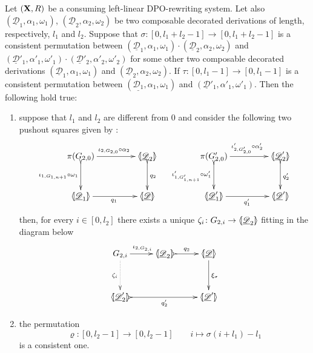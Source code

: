 \documentclass[a4paper,UKenglish,cleveref,pdftex, thm-restate,numberwithinsect]{lipics}
\def\R{\mathsf{R}}
\def\X{\textbf {\textup{X}}}
\newcommand{\dder}[1]{\mathscr{#1}}
\newcommand{\der}[1]{\underline{\dder{#1}}}
\newcommand{\lpro}{\langle \hspace{-1.85pt}[}
\newcommand{\rpro}{]\hspace{-1.85pt}\rangle}
\newcommand{\tpro}[1]{\lpro \der{#1}\rpro}
\begin{document}
\begin{lemma}\label{lem:presuffix} Let $(\X, \R)$ be a consuming left-linear DPO-rewriting system.  Let also $(\der{D}_1, \alpha_1, \omega_1)$, $(\der{D}_2, \alpha_2, \omega_2)$ be two composable decorated derivations of length, respectively, $l_1$ and $l_2$. Suppose that $\sigma\colon [0, l_1+l_2-1]\to [0, l_1+l_2-1]$ is a consistent permutation between $(\der{D}_1, \alpha_1, \omega_1)\cdot (\der{D}_2, \alpha_2, \omega_2)$ and $(\der{D}'_1, \alpha'_1, \omega'_1)\cdot (\der{D}'_2, \alpha'_2, \omega'_2)$ for some other two composable decorated derivations $(\der{D}_1, \alpha_1, \omega_1)$ and $(\der{D}_2, \alpha_2, \omega_2)$.  If $\tau\colon [0,l_1-1]\to [0, l_1-1]$ is a consistent permutation between $(\der{D_1}, \alpha_1, \omega_1)$ and $(\der{D}'_1, \alpha'_1, \omega'_1)$. Then the following hold true:
	\begin{enumerate}
		\item suppose that $l_1$ and $l_2$ are different from $0$ and consider the following two pushout squares given by :
		\[\xymatrix@C=45pt@R=30pt{\pi(G_{2,0}) \ar@{>->}[d]_{\iota_{1, G_{1,n+1}} \circ \omega_1}\ar[r]^{\iota_{2, G_{2,0}} \circ \alpha_2}& \lpro \der{D}_2 \rpro \ar@{>->}[d]^{q_2} &  \pi(G'_{2,0}) \ar@{>->}[d]_{\iota'_{1, G'_{1,n+1}} \circ \omega'_1} \ar[r]^{\iota'_{2, G'_{2,0}} \circ \alpha'_2}& \lpro \der{D}'_2 \rpro \ar@{>->}[d]^{q'_2} \\ \lpro \der{D}_1 \rpro  \ar[r]_{q_1} & \tpro{D} & \lpro \der{D}'_1\rpro \ar[r]_{q'_1} & \lpro \der{D}'\rpro  }\]
		then, for every $i\in [0, l_2]$ there exists a unique $\zeta_i\colon G_{2,i}\to \lpro \der{D}_2\rpro $ fitting in the diagram below
		\[\xymatrix@R=35pt{G_{2,i} \ar[r]^{\iota_{2,G_{2,i}}} \ar@{.>}[d]_{\zeta_i}&\lpro \der{D}_2 \rpro \ar@{>->}[r]^{q_2}& \tpro{D} \ar[d]^{\xi_{\sigma}} \\
			\lpro \der{D}'_2 \rpro \ar@{>->}[rr]_{q'_2}&& \lpro \der{D}'\rpro }\]
		\item the permutation
		\[\varrho\colon [0,l_2-1]\to [0, l_2-1] \qquad i \mapsto \sigma(i+l_1)-l_1\]
		is a consistent one.
	\end{enumerate}
\end{lemma}
\end{document}

